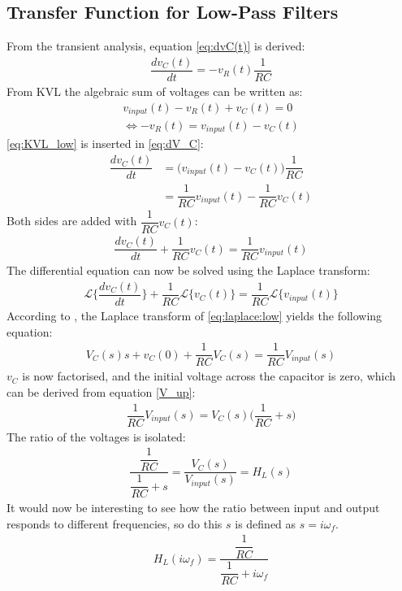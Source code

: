 \subsection{Transfer Function for Low-Pass Filters}
From the transient analysis, equation \eqref{eq:dvC(t)} is derived:
\begin{align} \label{eq:dV_C}
\dfrac{dv_C(t)}{dt}=-v_R(t)\dfrac{1}{RC}
\end{align}
From KVL the algebraic sum of voltages can be written as: 
\begin{align}
v_{input}(t)-v_{R}(t)+v_{C}(t)=0
\\
\Leftrightarrow -v_{R}(t) = v_{input}(t) - v_{C}(t) \label{eq:KVL_low}
\end{align}
\eqref{eq:KVL_low} is inserted in \eqref{eq:dV_C}:
\begin{align} 
\dfrac{dv_C(t)}{dt}&=\Big(v_{input}(t) - v_{C}(t)\Big)\dfrac{1}{RC}
\\
&=\dfrac{1}{RC}v_{input}(t) - \dfrac{1}{RC}v_{C}(t)
\end{align}
Both sides are added with $\dfrac{1}{RC}v_C(t)$:
\begin{align}
\dfrac{dv_C(t)}{dt}+\dfrac{1}{RC}v_C(t)=\dfrac{1}{RC}v_{input}(t)
\end{align}
The differential equation can now be solved using the Laplace transform:
\begin{align}\label{eq:laplace:low}\mathcal{L}\bigg\{\dfrac{dv_C(t)}{dt}\bigg\}+\dfrac{1}{RC}\mathcal{L}\Big\{v_C(t)\Big\}=\dfrac{1}{RC}\mathcal{L}\Big\{v_{input}(t)\Big\}
\end{align}
According to , the Laplace transform of \eqref{eq:laplace:low} yields the following equation:
\begin{align}
V_C(s)s+v_C(0)+\dfrac{1}{RC}V_C(s)=\dfrac{1}{RC}V_{input}(s)
\end{align} 
$v_{C}$ is now factorised, and the initial voltage across the capacitor is zero, which can be derived from equation \eqref{V_up}:
\begin{align}
\dfrac{1}{RC}V_{input}(s)=V_{C}(s)\Big(\dfrac{1}{RC}+s\Big)
\end{align} 
The ratio of the voltages is isolated:
\begin{align}
\dfrac{\dfrac{1}{RC}}{\dfrac{1}{RC}+s} = \dfrac{V_{C}(s)}{V_{input}(s)}=H_L(s)
\end{align}
It would now be interesting to see how the ratio between input and output responds to different frequencies, so do this $s$ is defined as $s=i\omega_f$.
\begin{align} \label{eq:trans_low}
H_{L}(i \omega_f) = \dfrac{\dfrac{1}{RC}}{\dfrac{1}{RC}+i \omega_f} 
\end{align}

